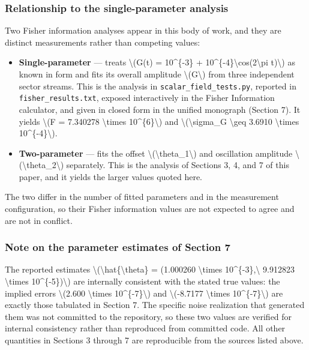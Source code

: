 \documentclass[
  10pt,
]{article}
\providecommand{\tightlist}{%
  \setlength{\itemsep}{0pt}\setlength{\parskip}{0pt}}
\begin{document}
\hypertarget{relationship-to-the-single-parameter-analysis}{%
\subsubsection{Relationship to the single-parameter
analysis}\label{relationship-to-the-single-parameter-analysis}}

Two Fisher information analyses appear in this body of work, and they
are distinct measurements rather than competing values:

\begin{itemize}
\tightlist
\item
  \textbf{Single-parameter} --- treats \textbackslash(G(t) =
  10\^{}\{-3\} + 10\^{}\{-4\}\textbackslash cos(2\textbackslash pi
  t)\textbackslash) as known in form and fits its overall amplitude
  \textbackslash(G\textbackslash) from three independent sector streams.
  This is the analysis in \texttt{scalar\_field\_tests.py}, reported in
  \texttt{fisher\_results.txt}, exposed interactively in the Fisher
  Information calculator, and given in closed form in the unified
  monograph (Section 7). It yields \textbackslash(F = 7.340278
  \textbackslash times 10\^{}\{6\}\textbackslash) and
  \textbackslash(\textbackslash sigma\_G \textbackslash geq 3.6910
  \textbackslash times 10\^{}\{-4\}\textbackslash).
\item
  \textbf{Two-parameter} --- fits the offset
  \textbackslash(\textbackslash theta\_1\textbackslash) and oscillation
  amplitude \textbackslash(\textbackslash theta\_2\textbackslash)
  separately. This is the analysis of Sections 3, 4, and 7 of this
  paper, and it yields the larger values quoted here.
\end{itemize}

The two differ in the number of fitted parameters and in the measurement
configuration, so their Fisher information values are not expected to
agree and are not in conflict.

\hypertarget{note-on-the-parameter-estimates-of-section-7}{%
\subsubsection{Note on the parameter estimates of Section
7}\label{note-on-the-parameter-estimates-of-section-7}}

The reported estimates
\textbackslash(\textbackslash hat\{\textbackslash theta\} = (1.000260
\textbackslash times 10\^{}\{-3\},\textbackslash{} 9.912823
\textbackslash times 10\^{}\{-5\})\textbackslash) are internally
consistent with the stated true values: the implied errors
\textbackslash(2.600 \textbackslash times 10\^{}\{-7\}\textbackslash)
and \textbackslash(-8.7177 \textbackslash times
10\^{}\{-7\}\textbackslash) are exactly those tabulated in Section 7.
The specific noise realization that generated them was not committed to
the repository, so these two values are verified for internal
consistency rather than reproduced from committed code. All other
quantities in Sections 3 through 7 are reproducible from the sources
listed above.
\end{document}
